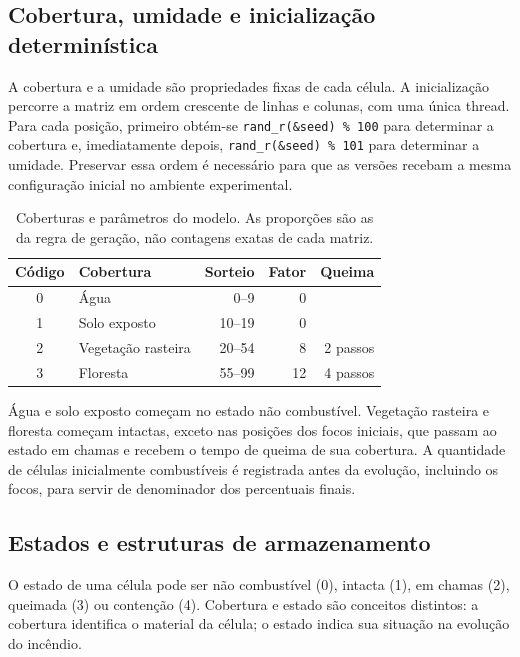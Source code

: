 \documentclass[12pt,a4paper]{article}
\newcommand{\pendente}{\textemdash}
\begin{document}
\subsection{Cobertura, umidade e inicialização determinística}\label{sec:inicializacao}

A cobertura e a umidade são propriedades fixas de cada célula. A
inicialização percorre a matriz em ordem crescente de linhas e colunas,
com uma única thread. Para cada posição, primeiro obtém-se
\texttt{rand\_r(\&seed) \% 100} para determinar a cobertura e, imediatamente
depois, \texttt{rand\_r(\&seed) \% 101} para determinar a umidade.
Preservar essa ordem é necessário para que as versões recebam a mesma
configuração inicial no ambiente experimental.

\begin{table}[H]
\centering
\caption{Coberturas e parâmetros do modelo. As proporções são as da regra de geração, não contagens exatas de cada matriz.}
\label{tab:cobertura}
\begin{tabular}{clrrr}
\toprule
\textbf{Código} & \textbf{Cobertura} & \textbf{Sorteio} & \textbf{Fator} & \textbf{Queima} \\
\midrule
0 & Água & 0--9 & 0 & \pendente \\
1 & Solo exposto & 10--19 & 0 & \pendente \\
2 & Vegetação rasteira & 20--54 & 8 & 2 passos \\
3 & Floresta & 55--99 & 12 & 4 passos \\
\bottomrule
\end{tabular}
\end{table}

Água e solo exposto começam no estado não combustível. Vegetação rasteira
e floresta começam intactas, exceto nas posições dos focos iniciais, que
passam ao estado em chamas e recebem o tempo de queima de sua cobertura.
A quantidade de células inicialmente combustíveis é registrada antes da evolução,
incluindo os focos, para servir de denominador dos percentuais finais.

\subsection{Estados e estruturas de armazenamento}

O estado de uma célula pode ser não combustível (0), intacta (1), em
chamas (2), queimada (3) ou contenção (4). Cobertura e estado são conceitos
distintos: a cobertura identifica o material da célula; o estado indica
sua situação na evolução do incêndio.
\end{document}
